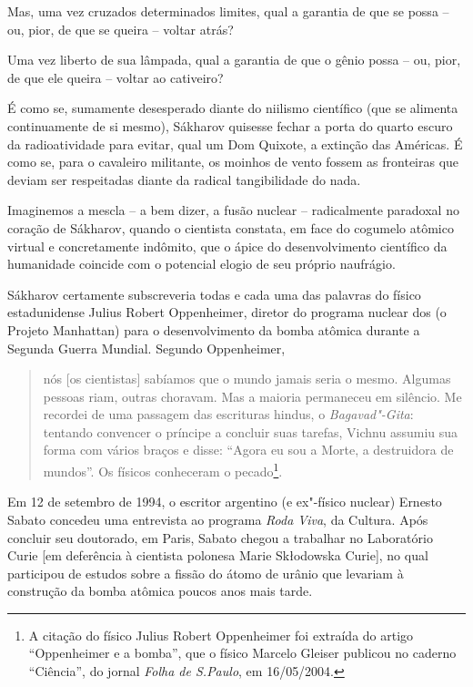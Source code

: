 Mas, uma vez cruzados determinados limites, qual a garantia de que se
possa -- ou, pior, de que se queira -- voltar atrás?

Uma vez liberto de sua lâmpada, qual a garantia de que o gênio possa --
ou, pior, de que ele queira -- voltar ao cativeiro?

É como se, sumamente desesperado diante do niilismo científico (que se
alimenta continuamente de si mesmo), Sákharov quisesse fechar a porta do
quarto escuro da radioatividade para evitar, qual um Dom Quixote, a
extinção das Américas. É como se, para o cavaleiro militante, os moinhos
de vento fossem as fronteiras que deviam ser respeitadas diante da
radical tangibilidade do nada.

Imaginemos a mescla -- a bem dizer, a fusão nuclear -- radicalmente
paradoxal no coração de Sákharov, quando o cientista constata, em face
do cogumelo atômico virtual e concretamente indômito, que o ápice do
desenvolvimento científico da humanidade coincide com o potencial elogio
de seu próprio naufrágio.

Sákharov certamente subscreveria todas e cada uma das palavras do físico
estadunidense Julius Robert Oppenheimer, diretor do programa nuclear dos
 (o Projeto Manhattan) para o desenvolvimento da bomba atômica
durante a Segunda Guerra Mundial. Segundo Oppenheimer,

\begin{quote}
nós {[}os cientistas{]} sabíamos que o mundo jamais seria o mesmo.
Algumas pessoas riam, outras choravam. Mas a maioria permaneceu em
silêncio. Me recordei de uma passagem das escrituras hindus, o
\emph{Bagavad"-Gita}: tentando convencer o príncipe a concluir suas
tarefas, Vichnu assumiu sua forma com vários braços e disse: ``Agora eu
sou a Morte, a destruidora de mundos''. Os físicos conheceram o
pecado\footnote{A citação do físico Julius Robert Oppenheimer foi
  extraída do artigo ``Oppenheimer e a bomba'', que o físico Marcelo
  Gleiser publicou no caderno ``Ciência'', do jornal \emph{Folha de
  S.Paulo}, em 16/05/2004.}.
\end{quote}

Em 12 de setembro de 1994, o escritor argentino (e ex"-físico nuclear)
Ernesto Sabato concedeu uma entrevista ao programa \emph{Roda Viva}, da
 Cultura. Após concluir seu doutorado, em Paris, Sabato chegou a
trabalhar no Laboratório Curie {[}em deferência à cientista polonesa
Marie Skłodowska Curie{]}, no qual participou de estudos sobre a fissão
do átomo de urânio que levariam à construção da bomba atômica poucos
anos mais tarde.

